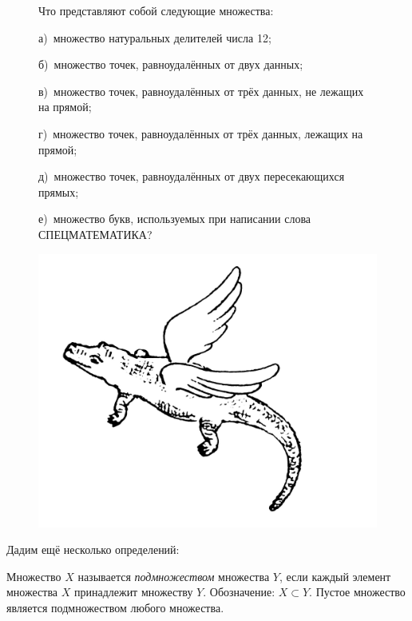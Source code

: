 {\setlength{\intextsep}{2pt}
\begin{figure}[h]
\begin{minipage}[h]{0.8\linewidth}\setlength{\parindent}{1.5em}
    \begin{ex}\label{5.0 u1}Что представляют собой следующие множества:
    \par
    а)~множество натуральных делителей числа 12;
    \par
    б)~множество точек, равноудалённых от двух данных;
    \par
    в)~множество точек, равноудалённых от трёх данных, не лежащих на прямой;
    \par
    г)~множество точек, равноудалённых от трёх данных, лежащих на прямой;
    \par
    д)~множество точек, равноудалённых от двух пересекающихся прямых;
    \par
    е)~множество букв, используемых при написании слова СПЕЦМАТЕМАТИКА?
    \end{ex}
\end{minipage}
\hfill
\begin{minipage}[h]{0.19\linewidth}
    \includegraphics[width=0.9\columnwidth]{./img/krokodil}
\end{minipage}
\end{figure}}

Дадим ещё несколько определений:
\begin{dfn}
Множество $X$ называется \textit{подмножеством} множества $Y$, если каждый элемент множества $X$ принадлежит множеству $Y$. Обозначение: $X \subset Y$. Пустое множество является подмножеством любого множества.
\end{dfn}

